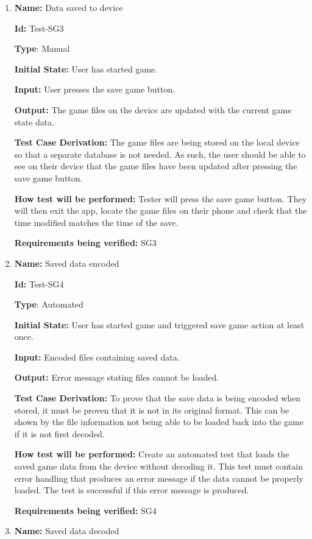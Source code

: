 \documentclass[12pt, titlepage]{article}
\begin{document}
\begin{enumerate}
\item{\textbf{Name:} Data saved to device}

\textbf{Id:} Test-SG3

\textbf{Type}: Manual

\textbf{Initial State:} User has started game.

\textbf{Input:} User presses the save game button.

\textbf{Output:} The game files on the device are updated with the current game state data.

\textbf{Test Case Derivation:}
The game files are being stored on the local device so that a separate database is not needed. As such, the user should be able to see on their device that the game files have been updated after pressing the save game button.

\textbf{How test will be performed:}
Tester will press the save game button. They will then exit the app, locate the game files on their phone and check that the time modified matches the time of the save. 

\textbf{Requirements being verified: } SG3

\item{\textbf{Name:} Saved data encoded}

\textbf{Id:} Test-SG4

\textbf{Type}: Automated

\textbf{Initial State:} User has started game and triggered save game action at least once.

\textbf{Input:} Encoded files containing saved data.

\textbf{Output:} Error message stating files cannot be loaded.

\textbf{Test Case Derivation:}
To prove that the save data is being encoded when stored, it must be proven that it is not in its original format. This can be shown by the file information not being able to be loaded back into the game if it is not first decoded.

\textbf{How test will be performed:}
Create an automated test that loads the saved game data from the device without decoding it. This test must contain error handling that produces an error message if the data cannot be properly loaded. The test is successful if this error message is produced.

\textbf{Requirements being verified: } SG4

\item{\textbf{Name:} Saved data decoded}


\end{enumerate}
\end{document}
